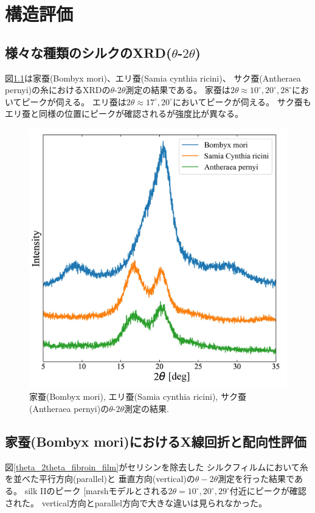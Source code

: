 \documentclass[dvipdfmx,12pt,a4paper]{jreport}
\makeatletter
\DeclareRobustCommand\cite{\unskip
    	\@ifnextchar[{\@tempswatrue\@citex}{\@tempswafalse\@citex[]}}
\makeatother
\begin{document}
	\chapter{構造評価}
			\section{様々な種類のシルクのXRD($\theta$-$2\theta$)}
			図\ref{様々な絹糸XRD}は家蚕(Bombyx mori)、エリ蚕(Samia cynthia ricini)、
			サク蚕(Antheraea pernyi)の糸におけるXRDの$\theta$-$2\theta$測定の結果である。
			家蚕は$2\theta \approx 10^{\circ}, 20^{\circ}, 28^{\circ}$においてピークが伺える。
			エリ蚕は$2\theta \approx 17^{\circ}, 20^{\circ}$においてピークが伺える。
			サク蚕もエリ蚕と同様の位置にピークが確認されるが強度比が異なる。
			\begin{figure}[h]
				\centering
				\includegraphics[scale=0.8]{糸の種類別XRD.jpg}
				\caption{家蚕(Bombyx mori), エリ蚕(Samia cynthia ricini), 
				サク蚕(Antheraea pernyi)の$\theta$-$2\theta$測定の結果.}
				\label{様々な絹糸XRD}
			\end{figure}
			\newpage
			\section{家蚕(Bombyx mori)におけるX線回折と配向性評価}
			図\ref{theta_2theta_fibroin_film}がセリシンを除去した
			シルクフィルムにおいて糸を並べた平行方向(parallel)と
			垂直方向(vertical)の$\theta - 2\theta$測定を行った結果である。
			silk IIのピーク\cite{marshモデル}とされる$2\theta = 10^{\circ}, 20^{\circ}, 29^{\circ}$付近にピークが確認された。
			vertical方向とparallel方向で大きな違いは見られなかった。
			
\end{document}
